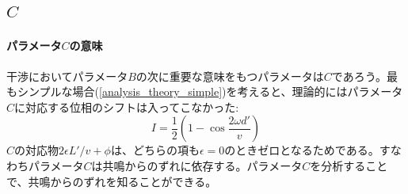 \subsection{$C$}
\paragraph{パラメータ$C$の意味}
干渉においてパラメータ$B$の次に重要な意味をもつパラメータは$C$であろう。最もシンプルな場合(\ref{analysis_theory_simple})を考えると、理論的にはパラメータ$C$に対応する位相のシフトは入ってこなかった:
\begin{equation}
I=\frac{1}{2}\left(1-\cos\frac{2\omega d'}{v}\right)
\end{equation}
$C$の対応物$2\epsilon L'/v +\phi$は、どちらの項も$\epsilon=0$のときゼロとなるためである。すなわちパラメータ$C$は共鳴からのずれに依存する。パラメータ$C$を分析することで、共鳴からのずれを知ることができる。

